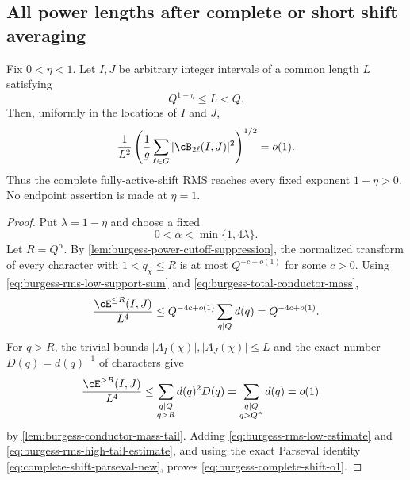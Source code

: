 \subsection{All power lengths after complete or short shift averaging}
\label{subsec:burgess-shift-rms}

\begin{theorem}
\label{thm:burgess-complete-shift-all-powers}
Fix $0<\eta<1$.  Let $I,J$ be arbitrary integer intervals of a common length
$L$ satisfying
\begin{equation}\label{eq:burgess-power-short-length}
 Q^{1-\eta}\le L<Q.
\end{equation}
Then, uniformly in the locations of $I$ and $J$,
\begin{equation}\label{eq:burgess-complete-shift-o1}
 \frac1{L^2}
 \left(
  \frac1g\sum_{\ell\in G}|\cB_{2\ell}(I,J)|^2
 \right)^{1/2}=o(1).
\end{equation}
Thus the complete fully-active-shift RMS reaches every fixed exponent
$1-\eta>0$.  No endpoint assertion is made at $\eta=1$.
\end{theorem}

\begin{proof}
Put $\lambda=1-\eta$ and choose a fixed
\begin{equation}\label{eq:burgess-rms-alpha-choice}
 0<\alpha<\min\{1,4\lambda\}.
\end{equation}
Let $R=Q^\alpha$.  By
\cref{lem:burgess-power-cutoff-suppression}, the normalized transform of every
character with $1<q_\chi\le R$ is at most $Q^{-c+o(1)}$ for some $c>0$.
Using \eqref{eq:burgess-rms-low-support-sum} and
\eqref{eq:burgess-total-conductor-mass},
\begin{equation}\label{eq:burgess-rms-low-estimate}
 \frac{\cE^{\le R}(I,J)}{L^4}
 \le Q^{-4c+o(1)}
     \sum_{q\mid Q}d(q)
 =Q^{-4c+o(1)}.
\end{equation}
For $q>R$, the trivial bounds $|A_I(\chi)|,|A_J(\chi)|\le L$ and the exact
number $D(q)=d(q)^{-1}$ of characters give
\begin{align}
 \frac{\cE^{>R}(I,J)}{L^4}
 &\le\sum_{\substack{q\mid Q\\q>R}}
 d(q)^2D(q)
 =\sum_{\substack{q\mid Q\\q>Q^\alpha}}d(q)
 =o(1)
 \label{eq:burgess-rms-high-tail-estimate}
\end{align}
by \cref{lem:burgess-conductor-mass-tail}.  Adding
\eqref{eq:burgess-rms-low-estimate} and
\eqref{eq:burgess-rms-high-tail-estimate}, and using the exact Parseval
identity \eqref{eq:complete-shift-parseval-new}, proves
\eqref{eq:burgess-complete-shift-o1}.
\end{proof}

